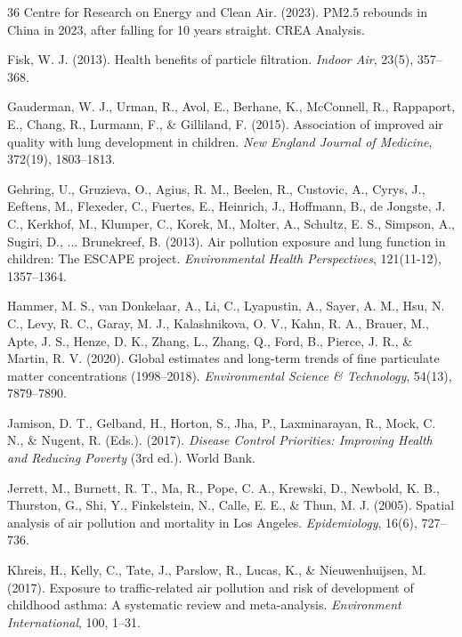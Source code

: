 \documentclass[11pt,a4paper]{article}
\begin{document}
\begin{thebibliography}{36}
Centre for Research on Energy and Clean Air. (2023). PM2.5 rebounds in China in 2023, after falling for 10 years straight. CREA Analysis.

Fisk, W. J. (2013). Health benefits of particle filtration. \textit{Indoor Air}, 23(5), 357--368.

Gauderman, W. J., Urman, R., Avol, E., Berhane, K., McConnell, R., Rappaport, E., Chang, R., Lurmann, F., \& Gilliland, F. (2015). Association of improved air quality with lung development in children. \textit{New England Journal of Medicine}, 372(19), 1803--1813.

Gehring, U., Gruzieva, O., Agius, R. M., Beelen, R., Custovic, A., Cyrys, J., Eeftens, M., Flexeder, C., Fuertes, E., Heinrich, J., Hoffmann, B., de Jongste, J. C., Kerkhof, M., Klumper, C., Korek, M., Molter, A., Schultz, E. S., Simpson, A., Sugiri, D., ... Brunekreef, B. (2013). Air pollution exposure and lung function in children: The ESCAPE project. \textit{Environmental Health Perspectives}, 121(11-12), 1357--1364.

Hammer, M. S., van Donkelaar, A., Li, C., Lyapustin, A., Sayer, A. M., Hsu, N. C., Levy, R. C., Garay, M. J., Kalashnikova, O. V., Kahn, R. A., Brauer, M., Apte, J. S., Henze, D. K., Zhang, L., Zhang, Q., Ford, B., Pierce, J. R., \& Martin, R. V. (2020). Global estimates and long-term trends of fine particulate matter concentrations (1998--2018). \textit{Environmental Science \& Technology}, 54(13), 7879--7890.

Jamison, D. T., Gelband, H., Horton, S., Jha, P., Laxminarayan, R., Mock, C. N., \& Nugent, R. (Eds.). (2017). \textit{Disease Control Priorities: Improving Health and Reducing Poverty} (3rd ed.). World Bank.

Jerrett, M., Burnett, R. T., Ma, R., Pope, C. A., Krewski, D., Newbold, K. B., Thurston, G., Shi, Y., Finkelstein, N., Calle, E. E., \& Thun, M. J. (2005). Spatial analysis of air pollution and mortality in Los Angeles. \textit{Epidemiology}, 16(6), 727--736.

Khreis, H., Kelly, C., Tate, J., Parslow, R., Lucas, K., \& Nieuwenhuijsen, M. (2017). Exposure to traffic-related air pollution and risk of development of childhood asthma: A systematic review and meta-analysis. \textit{Environment International}, 100, 1--31.


\end{thebibliography}
\end{document}
